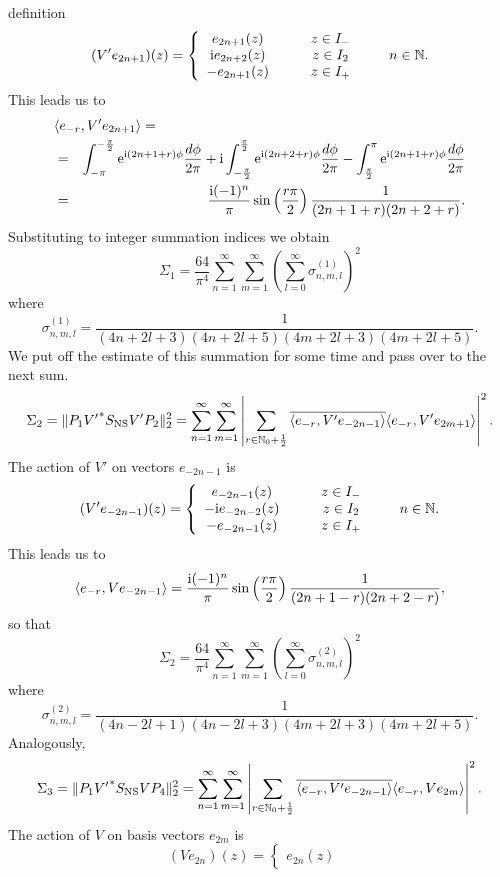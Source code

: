 \documentclass[10pt,a4paper]{article}
\begin{document}
\begin{appendix}
definition
\[ (V'e_{2n+1})(z) = \left\{ \begin{array}{cc} e_{2n+1}(z) &
\qquad z \in I_- \\
{\rm i} e_{2n+2}(z) & \qquad z \in I_2 \\ -e_{2n+1}(z) &
\qquad z \in I_+
\end{array} \right. \qquad n\in\mathbb{N}. \]
This leads us to
\begin{eqnarray*}
\lefteqn{\langle e_{-r},V' e_{2n+1} \rangle =}\\
&=& \int_{-\pi}^{-\frac{\pi}{2}}
\E^{\I(2n+1+r)\phi}\frac{d\phi}{2\pi} +
\I \int_{-\frac{\pi}{2}}^\frac{\pi}{2}
\E^{\I(2n+2+r)\phi} \frac{d\phi}{2\pi} -
\int_\frac{\pi}{2}^\pi \E^{\I(2n+1+r)\phi}
\frac{d\phi}{2\pi} \\
&=&  \frac{\I (-1)^n}{\pi} \sin
\left( \frac{r \pi}{2} \right) \frac{1}{(2n+1+r)(2n+2+r)}.
\end{eqnarray*}
Substituting to integer summation indices we obtain
\[ \Sigma_1 = \frac{64}{\pi^4} \sum_{n=1}^\infty
\sum_{m=1}^\infty \left( \sum_{l=0}^\infty
\sigma_{n,m,l}^{(1)} \right)^2 \]
where
\[ \sigma_{n,m,l}^{(1)} = \frac{1}{(4n+2l+3)(4n+2l+5)
(4m+2l+3)(4m+2l+5)}. \]
We put off the estimate of this summation for some
time and pass over to the next sum.
\[ \Sigma_2 = \| P_1 {V'}^* S_{\rm NS} V' P_2 \|_2^2
= \sum_{n=1}^\infty \sum_{m=1}^\infty \left|
\sum_{r \in \mathbb{N}_0 +\frac{1}{2}}
\overline{ \langle e_{-r}, V' e_{-2n-1} \rangle }
\langle e_{-r}, V' e_{2m+1} \rangle \right|^2 .\]
The action of $V'$ on vectors $e_{-2n-1}$ is
\[ (V'e_{-2n-1})(z) = \left\{ \begin{array}{cc}
e_{-2n-1}(z) & \qquad z \in I_- \\
-{\rm i} e_{-2n-2}(z) & \qquad z \in I_2 \\ -e_{-2n-1}(z) &
\qquad z \in I_+
\end{array} \right. \qquad n\in\mathbb{N} .\]
This leads us to
\[ \langle e_{-r}, V e_{-2n-1} \rangle = \frac{{\rm i} (-1)^n}{\pi}
\sin \left( \frac{r \pi}{2} \right)
\frac{1}{(2n+1-r)(2n+2-r)}, \]
so that
\[ \Sigma_2 = \frac{64}{\pi^4} \sum_{n=1}^\infty
\sum_{m=1}^\infty  \left( \sum_{l=0}^\infty
\sigma_{n,m,l}^{(2)} \right)^2  \]
where
\[ \sigma_{n,m,l}^{(2)} = \frac{1}{(4n-2l+1)(4n-2l+3)
(4m+2l+3)(4m+2l+5)}. \]
Analogously,
\[ \Sigma_3 = \| P_1 {V'}^* S_{\rm NS} V P_4 \|_2^2
= \sum_{n=1}^\infty \sum_{m=1}^\infty \left|
\sum_{r \in \mathbb{N}_0 +\frac{1}{2}}
\overline{ \langle e_{-r}, V' e_{-2n-1} \rangle }
\langle e_{-r}, V e_{2m} \rangle \right|^2 .\]
The action of $V$ on basis vectors $e_{2m}$ is
\[ (Ve_{2n})(z) = \left\{ \begin{array}{cc} e_{2n}(z) &

\end{array}\]
\end{appendix}
\end{document}
